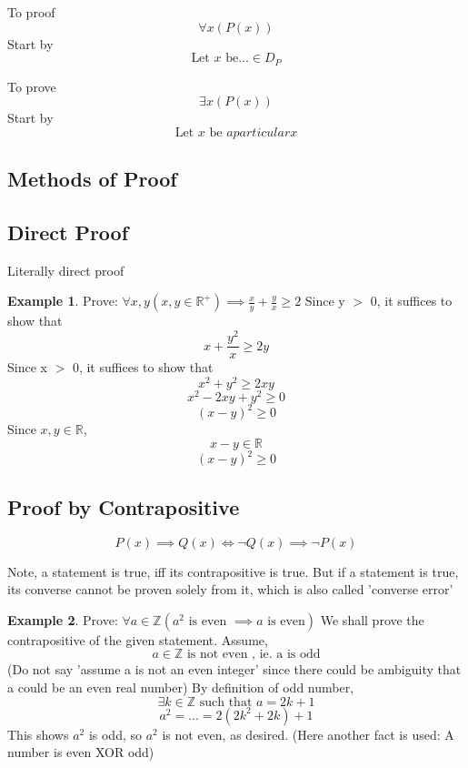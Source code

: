\documentclass[14pt]{article}
\theoremstyle{definition}
\newtheorem*{example}{Example}
\begin{document}
To proof
\[\forall x(P(x))\]
Start by 
\[ \text{Let } x \text{ be} ... \in D_P\]

To prove 
\[\exists x(P(x))\]
Start by 
\[\text{Let } x \text{ be } a particular x\]

\subsection*{Methods of Proof}
\subsection{Direct Proof}
Literally direct proof
\begin{example}
    Prove: \(\forall x, y(x, y \in \mathbb{R}^+) \implies \frac{x}{y} + \frac{y}{x} \geq 2\) \newline
    Since y \(>\) 0, it suffices to show that
    \[x + \frac{y^2}{x} \geq 2y\]
    Since x \(>\) 0, it suffices to show that
    \[x^2 + y^2 \geq 2xy\]
    \[x^2 -2xy + y^2 \geq 0\]
    \[(x - y)^2 \geq 0\]
    Since \(x, y \in \mathbb{R}\),
    \[x - y \in \mathbb{R}\]
    \[(x - y)^2 \geq 0\]
\end{example}
\subsection{Proof by Contrapositive}
\[P(x) \implies Q(x) \iff \neg Q(x) \implies \neg P(x)\]

Note, a statement is true, iff its contrapositive is true. But if a statement is true, its converse cannot be proven solely from it, which is also called 'converse error'
\begin{example}
    Prove: \(\forall a \in \mathbb{Z}(a^2 \text{ is even } \implies a \text{ is even}) \)
    We shall prove the contrapositive of the given statement.
    Assume, 
    \[a \in \mathbb{Z} \text{ is not even , ie. a is odd}\]
    (Do not say 'assume a is not an even integer' since there could be ambiguity that a could be an even real number)
    By definition of odd number, 
    \[\exists k \in \mathbb{Z} \text{ such that } a = 2k + 1\]
    \[a^2 = ... = 2(2k^2 + 2k) + 1\]
    This shows \(a^2\) is odd, so \(a^2\) is not even, as desired. 
    (Here another fact is used: A number is even XOR odd)
\end{example}
\end{document}
